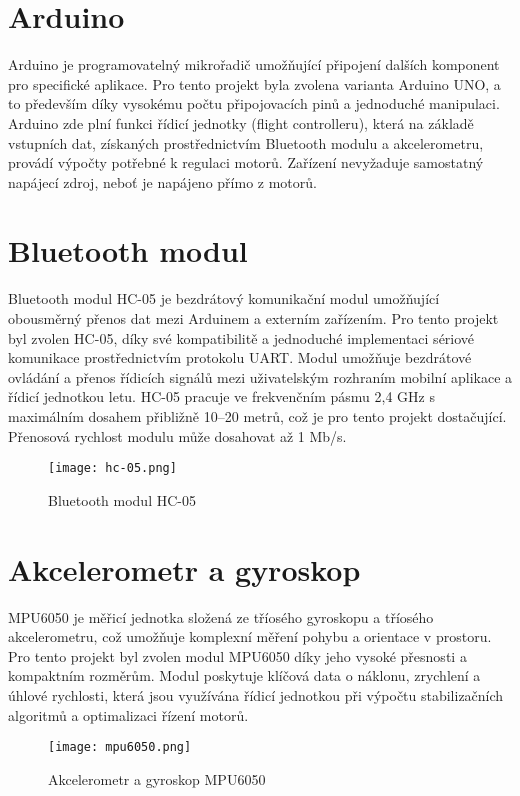 \documentclass[12pt]{report}
\begin{document}
\section[Arduino]{Arduino}
Arduino je programovatelný mikrořadič umožňující připojení dalších komponent pro specifické aplikace. Pro tento projekt byla zvolena varianta Arduino UNO, a to především díky vysokému počtu připojovacích pinů a jednoduché manipulaci. Arduino zde plní funkci řídicí jednotky (flight controlleru), která na základě vstupních dat, získaných prostřednictvím Bluetooth modulu a akcelerometru, provádí výpočty potřebné k regulaci motorů. Zařízení nevyžaduje samostatný napájecí zdroj, neboť je napájeno přímo z motorů.

\section[Bluetooth modul]{Bluetooth modul}
Bluetooth modul HC-05 je bezdrátový komunikační modul umožňující obousměrný přenos dat mezi Arduinem a externím zařízením. Pro tento projekt byl zvolen HC-05, díky své kompatibilitě a jednoduché implementaci sériové komunikace prostřednictvím protokolu UART. Modul umožňuje bezdrátové ovládání a přenos řídicích signálů mezi uživatelským rozhraním mobilní aplikace a řídicí jednotkou letu. HC-05 pracuje ve frekvenčním pásmu 2,4 GHz s maximálním dosahem přibližně 10–20 metrů, což je pro tento projekt dostačující. Přenosová rychlost modulu může dosahovat až 1 Mb/s. 
\begin{figure}[H]
	\centering
	\texttt{[image: hc-05.png]}
	\caption{Bluetooth modul HC-05}
	\label{fig:hc-05.png}
\end{figure}
\section[Akcelerometr a gyroskop]{Akcelerometr a gyroskop}
MPU6050 je měřicí jednotka složená ze tříosého gyroskopu a tříosého akcelerometru, což umožňuje komplexní měření pohybu a orientace v prostoru. Pro tento projekt byl zvolen modul MPU6050 díky jeho vysoké přesnosti a kompaktním rozměrům. Modul poskytuje klíčová data o náklonu, zrychlení a úhlové rychlosti, která jsou využívána řídicí jednotkou při výpočtu stabilizačních algoritmů a optimalizaci řízení motorů.
\begin{figure}[H]
	\centering
	\texttt{[image: mpu6050.png]}
	\caption{Akcelerometr a gyroskop MPU6050}
	\label{fig:hc-05.png}
\end{figure}
\end{document}
